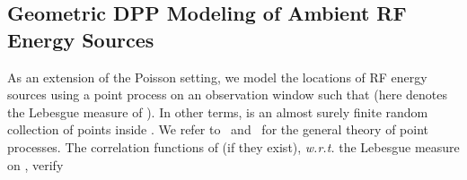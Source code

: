 \documentclass[12pt,draftclsnofoot,onecolumn]{IEEEtran}
\begin{document}
\begin{comment}
The main notations used in this paper are summarized in Table~\ref{notation}.


\begin{table}
\centering
\caption{\footnotesize NOTATIONS.} \label{notation}
\begin{tabular}{|l|l|} 
\hline
Symbol & Definition\\ \hline
\hline
  & Portion of time a receiver working on energy harvesting mode   \\
  & Aggregated RF energy harvesting rate at the sensor    \\
  & Constant circuit power consumption of the sensor \\
    &  RF-to-DC power conversion efficiency of a sensor  \\
   &   Transmit power of RF energy source    \\
  & Transmit antenna gain of RF energy source    \\
  &  Receive antenna gain of a sensor \\
   & Wavelength emitted at RF energy source .  \\
  &  Distance between the transmit antenna of RF energy source   the receiver antenna of a sensor   \\
  &  Coordinates of a sensor  \\
  &  Coordinates of the RF energy source   \\    
  & Channel gain between the sensor and data sink \\
   & Power of AWGN \\
  & Power of signal processing noise \\
  & Transmission bandwidth \\
   & Minimum transmission rate requirement \\                    
\hline                                            
\end{tabular}
\end{table}
\end{comment}


\subsection{Geometric DPP Modeling of Ambient RF Energy Sources}
\label{sec:geometricmodeling}

As an extension of the Poisson setting, we model the locations of RF energy sources using a point process  on an observation window  such that  (here  denotes the Lebesgue measure of ). In other terms,  is an almost surely finite random collection of points inside . We refer to~\cite{Kallenberg} and~\cite{DaleyVereJones} for the general theory of point processes. The correlation functions  of  (if they exist), {\em w.r.t.} the Lebesgue measure on ,  verify
\end{document}
